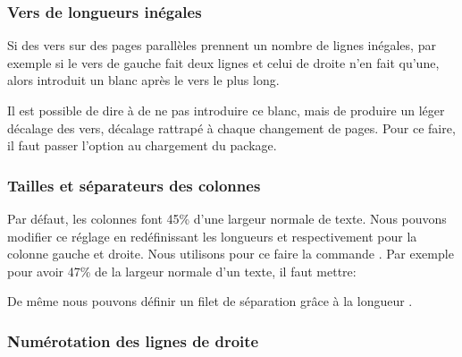 \subsubsection{Vers de longueurs inégales}

Si des vers sur des pages parallèles prennent un nombre de lignes inégales, par exemple si le vers de gauche fait deux lignes et celui de droite n'en fait qu'une, alors  introduit un blanc après le vers le plus long.

Il est possible de dire à  de ne pas introduire ce blanc, mais de produire un léger décalage des vers, décalage rattrapé à chaque changement de pages. Pour ce faire, il faut passer l'option  au chargement du package.

\begin{latexcode}
\usepackage[shiftedverses]{ledpar}
\end{latexcode}
 
 \subsubsection{Tailles et séparateurs des colonnes}

Par défaut, les colonnes font 45\% d'une largeur normale de texte. Nous pouvons modifier ce réglage en redéfinissant les longueurs  et  respectivement pour la colonne gauche et droite. Nous utilisons pour ce faire la commande . Par exemple pour avoir 47\% de la largeur normale d'un texte, il faut mettre:

\begin{latexcode}
\setlength{\Lcolwidth}{0.47\textwidth}
\setlength{\Rcolwidth}{0.47\textwidth}
\end{latexcode}

De même nous pouvons définir un filet de séparation grâce à la longueur .

\begin{latexcode}
\setlength{columnrulewidth}{0.4pt}
\end{latexcode}

\begin{latexcode}
\end{latexcode}

\subsubsection{Numérotation des lignes de droite}

